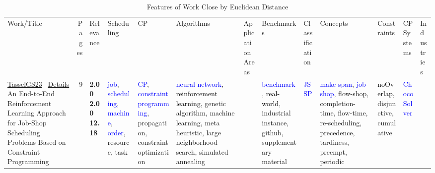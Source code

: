 {\scriptsize
\begin{longtable}{>{\raggedright\arraybackslash}p{3cm}r>{\raggedright\arraybackslash}p{1.0cm}>{\raggedright\arraybackslash}p{ 1.50cm}>{\raggedright\arraybackslash}p{ 1.50cm}>{\raggedright\arraybackslash}p{ 1.50cm}>{\raggedright\arraybackslash}p{ 1.50cm}>{\raggedright\arraybackslash}p{ 1.50cm}>{\raggedright\arraybackslash}p{ 1.50cm}>{\raggedright\arraybackslash}p{ 1.50cm}>{\raggedright\arraybackslash}p{ 1.50cm}>{\raggedright\arraybackslash}p{ 1.50cm}>{\raggedright\arraybackslash}p{ 1.50cm}}
\rowcolor{white}\caption{Features of Work Close by Euclidean Distance}\\ \toprule
\rowcolor{white}Work/Title & Pages & Relevance & Scheduling& CP& Algorithms& ApplicationAreas& Benchmarks& Classification& Concepts& Constraints& CPSystems& Industries\\ \midrule\endhead
\bottomrule
\endfoot
\href{../scheduling/works/TasselGS23.pdf}{TasselGS23}~\cite{TasselGS23} \hyperref[detail:TasselGS23]{Details} An End-to-End Reinforcement Learning Approach for Job-Shop Scheduling Problems Based on Constraint Programming & 9 & \noindent{}\textbf{2.00} \textbf{2.00} \textbf{12.18} & \textcolor{blue}{job}, \textcolor{blue}{scheduling}, \textcolor{blue}{machine}, \textcolor{blue}{order}, \textcolor{black}{resource}, \textcolor{black!40}{task} & \textcolor{blue}{CP}, \textcolor{blue}{constraint programming}, \textcolor{black!40}{propagation}, \textcolor{black!40}{constraint optimization} & \textcolor{blue}{neural network}, \textcolor{black}{reinforcement learning}, \textcolor{black!40}{genetic algorithm}, \textcolor{black!40}{machine learning}, \textcolor{black!40}{meta heuristic}, \textcolor{black!40}{large neighborhood search}, \textcolor{black!40}{simulated annealing} &  & \textcolor{blue}{benchmark}, \textcolor{black}{real-world}, \textcolor{black!40}{industrial instance}, \textcolor{black!40}{github}, \textcolor{black!40}{supplementary material} & \textcolor{blue}{JSSP} & \textcolor{blue}{make-span}, \textcolor{blue}{job-shop}, \textcolor{black!40}{flow-shop}, \textcolor{black!40}{completion-time}, \textcolor{black!40}{flow-time}, \textcolor{black!40}{re-scheduling}, \textcolor{black!40}{precedence}, \textcolor{black!40}{tardiness}, \textcolor{black!40}{preempt}, \textcolor{black!40}{periodic} & \textcolor{black}{noOverlap}, \textcolor{black!40}{disjunctive}, \textcolor{black!40}{cumulative} & \textcolor{blue}{Choco Solver} & \\

\end{longtable}}
